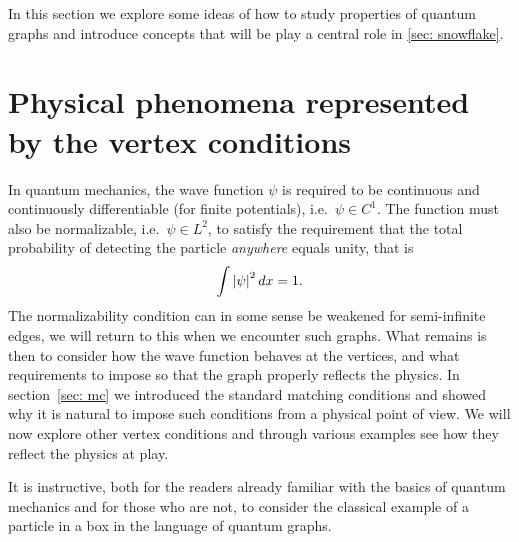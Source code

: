 In this section we explore some ideas of how to study properties of quantum graphs and introduce concepts that will be play a central role in \cref{sec: snowflake}.



\section{Physical phenomena represented by the vertex conditions}\label{sec: physical interpretation mc}

In quantum mechanics, the wave function $\psi$ is required to be continuous and continuously differentiable (for finite potentials), i.e.\ $\psi \in C^1$. The function must also be normalizable, i.e.\ $\psi \in L^2$, to satisfy the requirement that the total probability of detecting the particle \emph{anywhere} equals unity, that is
\[
  \int \left\lvert\psi\right\rvert^2 dx = 1.
\]
The normalizability condition can in some sense be weakened for semi-infinite edges, we will return to this when we encounter such graphs. What remains is then to consider how the wave function behaves at the vertices, and what requirements to impose so that the graph properly reflects the physics. In section~\ref{sec: mc} we introduced the standard matching conditions and showed why it is natural to impose such conditions from a physical point of view. We will now explore other vertex conditions and through various examples see how they reflect the physics at play.

It is instructive, both for the readers already familiar with the basics of quantum mechanics and for those who are not, to consider the classical example of a particle in a box in the language of quantum graphs.


